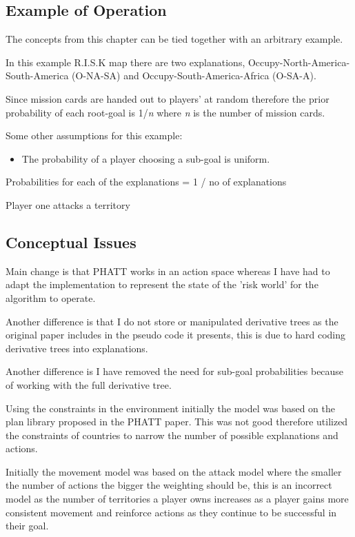\documentclass[parskip]{cs4rep}
\begin{document}
\subsection{Example of Operation}

The concepts from this chapter can be tied together with an arbitrary example.

In this example R.I.S.K map there are two explanations, Occupy-North-America-South-America (O-NA-SA) and Occupy-South-America-Africa (O-SA-A). 

Since mission cards are handed out to players' at random therefore the prior probability of each root-goal is 1/\textit{n} where \textit{n} is the number of mission cards. 

Some other assumptions for this example:

\begin{itemize}
\item
The probability of a player choosing a sub-goal is uniform.
\end{itemize}

Probabilities for each of the explanations = 1 / no of explanations

Player one attacks a territory 

\subsection{Conceptual Issues}

Main change is that PHATT works in an action space whereas I have had to adapt the implementation to represent the state of the 'risk world' for the algorithm to operate.

Another difference is that I do not store or manipulated derivative trees as the original paper includes in the pseudo code it presents, this is due to hard coding derivative trees into explanations.

Another difference is I have removed the need for sub-goal probabilities because of working with the full derivative tree.

Using the constraints in the environment initially the model was based on the plan library proposed in the PHATT paper. This was not good therefore utilized the constraints of countries to narrow the number of possible explanations and actions.

Initially the movement model was based on the attack model where the smaller the number of actions the bigger the weighting should be, this is an incorrect model as the number of territories a player owns increases as a player gains more consistent movement and reinforce actions as they continue to be successful in their goal.
\end{document}
